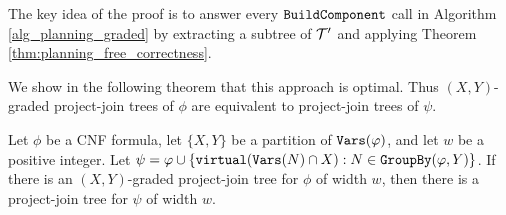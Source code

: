 The key idea of the proof is to answer every $\texttt{\upshape BuildComponent}$ call in Algorithm \ref{alg_planning_graded} by extracting a subtree of $\mathcal{T}'$ and applying Theorem \ref{thm:planning_free_correctness}. %

We show in the following theorem that this approach is optimal. Thus $(X,Y)$-graded project-join trees of $\phi$ are equivalent to project-join trees of $\psi$.
\begin{theorem}
\label{thm:planning_graded_optimal}
Let $\phi$ be a CNF formula, let $\{X, Y\}$ be a partition of $\texttt{\upshape Vars}(\varphi)$, and let $w$ be a positive integer. Let $\psi = \varphi \cup \{\texttt{\upshape virtual}(\texttt{\upshape Vars}(N)\cap X) : N \in \texttt{\upshape GroupBy}(\varphi, Y)\}$. %
If there is an $(X,Y)$-graded project-join tree for $\phi$ of width $w$, then there is a project-join tree for $\psi$ of width $w$.
\end{theorem}
